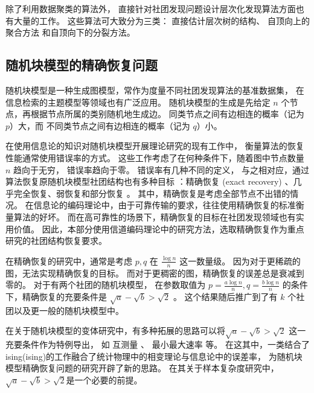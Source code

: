 除了利用数据聚类的算法外，
直接针对社团发现问题设计层次化发现算法方面也有大量的工作。
这些算法可大致分为三类\cite{li2022hierarchical}：
直接估计层次树的结构\cite{arenas2006synchronization, blundell2013bhcd}、
自顶向上的聚合方法\cite{clauset2004finding}
和自顶向下的分裂方法\cite{girvan2002community, dasgupta2016cost}。

\subsection{随机块模型的精确恢复问题}
随机块模型是一种生成图模型，常作为度量不同社团发现算法的基准数据集，
在信息检索的主题模型等领域也有广泛应用\cite{Gerlach_2018}。
随机块模型的生成是先给定 $n$ 个节点，再根据节点所属的类别随机地生成边。
同类节点之间有边相连的概率（记为 $p$）大，而
不同类节点之间有边相连的概率（记为 $q$）小\cite{abbe2017community}。

在使用信息论的知识对随机块模型开展理论研究的现有工作中，
衡量算法的恢复性能通常使用错误率的方式。
这些工作考虑了在何种条件下，随着图中节点数量 $n$ 趋向于无穷，
错误率趋向于零。
错误率有几种不同的定义，
与之相对应，通过算法恢复原随机块模型社团结构也有多种目标
：精确恢复 (exact recovery) 、几乎完全恢复、弱恢复和部分恢复
\cite{abbe2017community}。
其中，精确恢复是考虑全部节点不出错的情况。
在信息论的编码理论中，由于可靠传输的要求，往往使用精确恢复的标准衡量算法的好坏。
而在高可靠性的场景下，精确恢复的目标在社团发现领域也有实用价值。
因此，本部分使用信道编码理论中的研究方法，选取精确恢复作为重点研究的社团结构恢复要求。


在精确恢复的研究中，通常是考虑 $p, q$ 在 $\frac{\log n}{n}$ 这一数量级。
因为对于更稀疏的图，无法实现精确恢复的目标。
而对于更稠密的图，精确恢复的误差总是衰减到零的。
对于有两个社团的随机块模型，
在参数取值为 $p=\frac{a \log n}{n}, q = \frac{b \log n }{n}$
的条件下，精确恢复的充要条件是
$\sqrt{a} - \sqrt{b} > \sqrt{2}$ \cite{abbe2015exact, mossel2016}。
这个结果随后推广到了有 $k$ 个社团以及更一般的随机块模型中\cite{abbe2015community}。

在关于随机块模型的变体研究中，有多种拓展的思路可以将$\sqrt{a} - \sqrt{b} > \sqrt{2}$
这一充要条件作为特例导出，
如 互测量 \cite{chen2016information}、 最小最大速率 \cite{zhang2016} 等。
在这其中，一类结合了\gls{ising}(\glsdesc{ising})的工作融合了统计物理中的相变理论与信息论中的误差率\cite{ye2020exact}，
为随机块模型精确恢复问题的研究开辟了新的思路。
在其关于样本复杂度研究中，$\sqrt{a} - \sqrt{b} > \sqrt{2}$是一个必要的前提。


